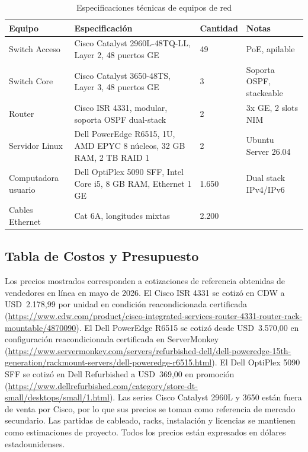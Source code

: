 \begin{table}[H]
\centering
\caption{Especificaciones técnicas de equipos de red}
\label{tab:equipo_specs}
\begin{tabularx}{\textwidth}{l X l l}
\toprule
\textbf{Equipo} & \textbf{Especificación} & \textbf{Cantidad}
& \textbf{Notas} \\
\midrule
Switch Acceso
  & Cisco Catalyst 2960L-48TQ-LL, Layer 2, 48 puertos GE
  & 49
  & PoE, apilable \\
Switch Core
  & Cisco Catalyst 3650-48TS, Layer 3, 48 puertos GE
  & 3
  & Soporta OSPF, stackeable \\
Router
  & Cisco ISR 4331, modular, soporta OSPF dual-stack
  & 2
  & 3x GE, 2 slots NIM \\
Servidor Linux
  & Dell PowerEdge R6515, 1U, AMD EPYC 8 núcleos, 32 GB RAM, 2 TB RAID 1
  & 2
  & Ubuntu Server 26.04  \\
Computadora usuario
  & Dell OptiPlex 5090 SFF, Intel Core i5, 8 GB RAM, Ethernet 1 GE
  & 1.650
  & Dual stack IPv4/IPv6 \\
Cables Ethernet
  & Cat 6A, longitudes mixtas
  & 2.200
  & \\
\bottomrule
\end{tabularx}
\end{table}

\subsection{Tabla de Costos y Presupuesto}

Los precios mostrados corresponden a cotizaciones de referencia obtenidas de
vendedores en línea en mayo de 2026. El Cisco ISR 4331 se cotizó en CDW a
USD~2.178,99 por unidad en condición reacondicionada certificada
(\url{https://www.cdw.com/product/cisco-integrated-services-router-4331-router-rack-mountable/4870090}).
El Dell PowerEdge R6515 se cotizó desde USD~3.570,00 en configuración
reacondicionada certificada en ServerMonkey
(\url{https://www.servermonkey.com/servers/refurbished-dell/dell-poweredge-15th-generation/rackmount-servers/dell-poweredge-r6515.html}).
El Dell OptiPlex 5090 SFF se cotizó en Dell Refurbished a USD~369,00 en promoción
(\url{https://www.dellrefurbished.com/category/store-dt-small/desktops/small/1.html}).
Las series Cisco Catalyst 2960L y 3650 están fuera de venta por Cisco, por lo que
sus precios se toman como referencia de mercado secundario.
Las partidas de cableado, racks, instalación y licencias se mantienen como
estimaciones de proyecto. Todos los precios están expresados en dólares
estadounidenses.

